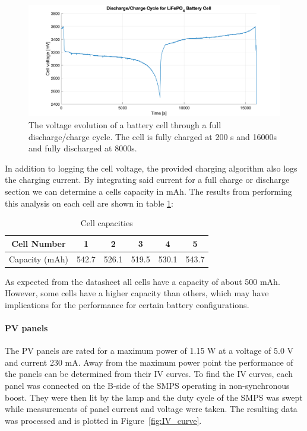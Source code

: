 \documentclass[a4paper]{article}
\begin{document}
\begin{figure}[H]
    \centering
    \includegraphics[scale=0.22]{Charge_Cycle2.png}
    \caption{The voltage evolution of a battery cell through a full discharge/charge cycle. The
    cell is fully charged at 200 s and 16000s and fully discharged at 8000s.}
    \label{fig:charge_cycle}
\end{figure}

In addition to logging the cell voltage, the provided charging algorithm also 
logs the charging current. By integrating said current for a full charge or 
discharge section we can determine a cells capacity in mAh. The results from 
performing this analysis on each cell are shown in table \ref{table:1}:

\vspace{5pt}
\begin{table}[h!]
    \centering
    \begin{tabular}{||c| c c c c c||} 
        \hline
        Cell Number& 1 & 2 & 3 & 4 & 5 \\ [0.5ex] 
        \hline
        Capacity (mAh) & 542.7	& 526.1	& 519.5	& 530.1	& 543.7\\ [1ex] 
        \hline
    \end{tabular}
    \caption{Cell capacities}
    \label{table:1}
\end{table}

As expected from the datasheet\cite{batteryDatasheet} all cells have a capacity of about 500 mAh. However, some cells 
have a higher capacity than others, which may have implications for the 
performance for certain battery configurations.

\paragraph*{PV panels}
The PV panels are rated for a maximum power of 1.15 W at a voltage of 
5.0 V and current 230 mA. Away from the maximum power point the performance 
of the panels can be determined from their IV curves. To find the IV 
curves, each panel was connected on the B-side of the SMPS operating 
in non-synchronous boost. They were then lit by the lamp and the duty 
cycle of the SMPS was swept while measurements of panel current and 
voltage were taken. The resulting data was processed and is plotted 
in Figure~\ref{fig:IV_curve}.
\end{document}
